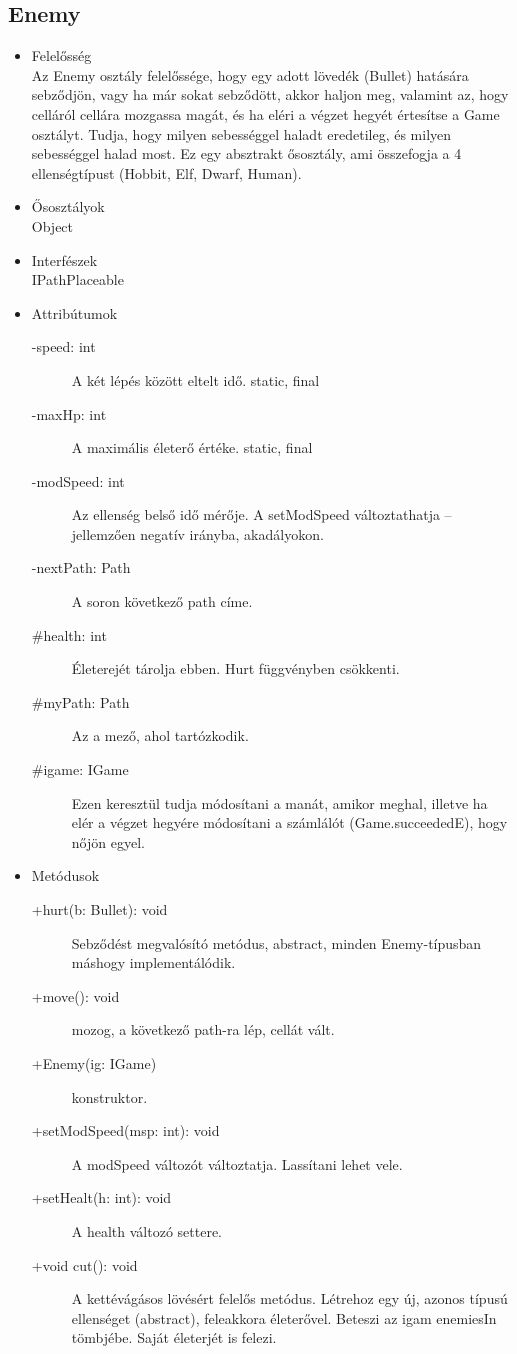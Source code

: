\begin{itemize}
\begin{description}
	\end{description}
\end{itemize}


\subsection{Enemy}
\begin{itemize}
\item Felelősség\\
Az Enemy osztály felelőssége, hogy egy adott lövedék (Bullet) hatására sebződjön, vagy ha már sokat sebződött, akkor haljon meg, valamint az, hogy celláról cellára mozgassa magát, és ha eléri a végzet hegyét értesítse a Game osztályt. Tudja, hogy milyen sebességgel haladt eredetileg, és milyen sebességgel halad most. Ez egy absztrakt ősosztály, ami összefogja a 4 ellenségtípust (Hobbit, Elf, Dwarf, Human).
\item Ősosztályok\\
Object
\item Interfészek\\
IPathPlaceable
\item Attribútumok
	\begin{description}
		\item[-speed: int] A két lépés között eltelt idő. static, final
		\item[-maxHp: int] A maximális életerő értéke. static, final
\item[-modSpeed: int] Az ellenség belső idő mérője. A setModSpeed változtathatja – jellemzően negatív irányba, akadályokon. 
\item[-nextPath: Path] A soron következő path címe. 
\item[\#health: int] Életerejét tárolja ebben. Hurt függvényben csökkenti. 
\item[\#myPath: Path] Az a mező, ahol tartózkodik. 
\item[\#igame: IGame] Ezen keresztül tudja módosítani a manát, amikor meghal, illetve ha elér a végzet hegyére módosítani a számlálót (Game.succeededE), hogy nőjön egyel. 

	\end{description}
\item Metódusok
	\begin{description}
		\item[+hurt(b: Bullet): void] Sebződést megvalósító metódus, abstract, minden Enemy-típusban máshogy implementálódik. 
\item[+move(): void] mozog, a következő path-ra lép, cellát vált. 
\item[+Enemy(ig: IGame)] konstruktor. 
\item[+setModSpeed(msp: int): void] A modSpeed változót változtatja. Lassítani lehet vele. 
\item[+setHealt(h: int): void] A health változó settere. 
\item[+void cut(): void] A kettévágásos lövésért felelős metódus. Létrehoz egy új, azonos típusú ellenséget (abstract), feleakkora életerővel. Beteszi az igam enemiesIn tömbjébe. Saját életerjét is felezi. 

	\end{description}
\end{itemize}

